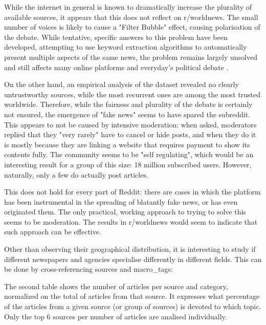 \documentclass{article}
\begin{document}
While the internet in general is known to dramatically increase the plurality of available sources\cite{unescotrendmediapluralism}, it appears that this does not reflect on r/worldnews. The small number of voices is likely to cause a "Filter Bubble" effect, causing polarisation of the debate. 
While tentative, specific answers to this problem have been developed\cite{newscube}, attempting to use keyword extraction algorithms to automatically present multiple aspects of the same news, the problem remains largely unsolved and still affects many online platforms and everyday's political debate \cite{2017filterbubble}.

On the other hand, an empirical analysis of the dataset revealed no clearly untrustworthy sources, while the most recurrent ones are among the most trusted worldwide. Therefore, while the fairness and plurality of the debate is certainly not ensured, the emergence of "fake news" seems to have spared the subreddit. This appears to not be caused by intensive moderation: when asked, moderators replied that they "very rarely" have to cancel or hide posts, and when they do it is mostly because they are linking a website that requires payment to show its contents fully. The community seems to be "self regulating", which would be an interesting result for a group of this size: 18 million subscribed users. However, naturally, only a few do actually post articles.

This does not hold for every part of Reddit: there are cases in which the platform has been instrumental in the spreading of blatantly fake news, or has even originated them\cite{fakenewsviral}. The only practical, working approach to trying to solve this seems to be moderation\cite{trumpmoderatorsreddit}. The results in r/worldnews would seem to indicate that such approach can be effective.

\bigskip

Other than observing their geographical distribution, it is interesting to study if different newspapers and agencies specialise differently in different fields. This can be done by cross-referencing sources and macro\_tags:

\bigskip


\bigskip


\bigskip

The second table shows the number of articles per source and category, normalized on the total of articles from that source. It expresses what percentage of the articles from a given source (or group of sources) is devoted to which topic. Only  the top 6 sources per number of articles are analised individually.
\end{document}
